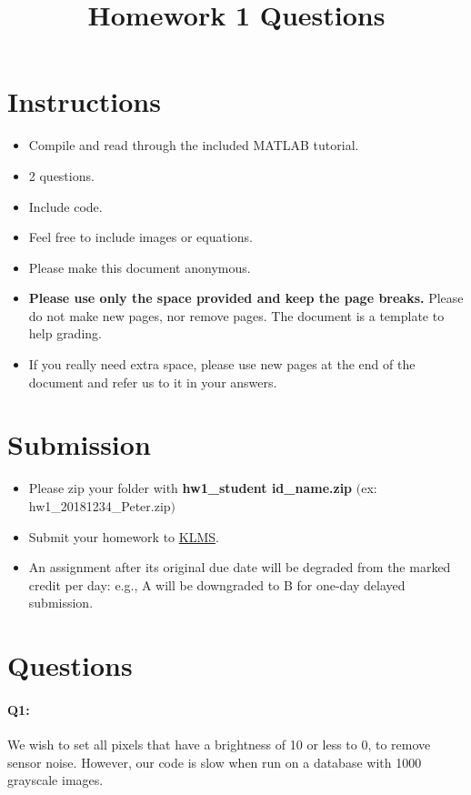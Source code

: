 \documentclass[11pt]{article}
\date{}
\title{\vspace{-1cm}Homework 1 Questions}
\begin{document}
\maketitle
\vspace{-2cm}
\thispagestyle{fancy}

\section*{Instructions}
\begin{itemize}
  \item Compile and read through the included MATLAB tutorial.
  \item 2 questions.
  \item Include code.
  \item Feel free to include images or equations.
  \item Please make this document anonymous.
  \item \textbf{Please use only the space provided and keep the page breaks.} Please do not make new pages, nor remove pages. The document is a template to help grading.
  \item If you really need extra space, please use new pages at the end of the document and refer us to it in your answers.
\end{itemize}


\section*{Submission}
\begin{itemize}
	\item Please zip your folder with \textbf{hw1\_student id\_name.zip} $($ex: hw1\_20181234\_Peter.zip$)$
	\item Submit your homework to \href{http://klms.kaist.ac.kr/course/view.php?id=99418}{KLMS}.
	\item An assignment after its original due date will be degraded from the marked credit per day: e.g., A will be downgraded to B for one-day delayed submission.
\end{itemize}

\pagebreak


\section*{Questions}



\paragraph{Q1:} We wish to set all pixels that have a brightness of 10 or less to 0, to remove sensor noise. However, our code is slow when run on a database with 1000 grayscale images.
\end{document}
